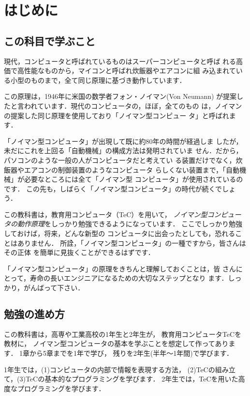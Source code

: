 \chapter{はじめに}

\section{この科目で学ぶこと}
現代，コンピュータと呼ばれているものはスーパーコンピュータと呼ば
れる高価で高性能なものから，マイコンと呼ばれ炊飯器やエアコンに組
み込まれている小型のものまで，全て同じ原理に基づき動作しています．

この原理は，1946年に米国の数学者フォン・ノイマン(Von Neumann)
が提案したと言われています．現代のコンピュータの，ほぼ，全てのもの
は，ノイマンの提案した同じ原理を使用しており「ノイマン型コンピュー
タ」と呼ばれます．

「ノイマン型コンピュータ」が出現して既に約80年の時間が経過しま
したが，未だにこれを上回る「自動機械」の構成方法は発明されていま
せん．だから，パソコンのような一般の人がコンピュータだと考えてい
る装置だけでなく，炊飯器やエアコンの制御装置のようなコンピュータ
らしくない装置まで，「自動機械」が必要なところには全て「ノイマン型
コンピュータ」が使用されているのです．
この先も，しばらく「ノイマン型コンピュータ」の時代が続くでしょう．

この教科書は，教育用コンピュータ（TeC）を用いて，
\emph{ノイマン型コンピュータの動作原理}をしっかり勉強できるようになっています．
ここでしっかり勉強しておけば，将来，どんな新型の
コンピュータに出会ったとしても，恐れることはありません．
所詮，「ノイマン型コンピュータ」の一種ですから，皆さんはその正体
を簡単に見抜くことができるはずです．

「ノイマン型コンピュータ」の原理をきちんと理解しておくことは，皆
さんにとって，寿命の長いエンジニアになるための大切なステップとなり
ます．しっかり，がんばって下さい．

\section{勉強の進め方}

この教科書は，高専や工業高校の1年生と2年生が，
教育用コンピュータTeCを教材に，
ノイマン型コンピュータの基本を学ぶことを想定して作ってあります．
1章から5章までを1年で学び，
残りを2年生(半年〜1年間)で学びます．

1年生では，(1)コンピュータの内部で情報を表現する方法，
(2)TeCの組み立て，(3)TeCの基本的なプログラミングを学びます．
2年生では，TeCを用いた高度なプログラミングを学びます．

